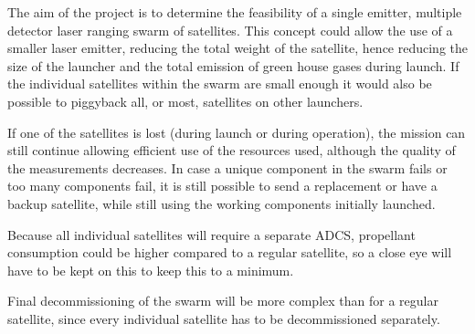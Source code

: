 The aim of the project is to determine the feasibility of a single emitter, multiple detector laser ranging swarm of satellites. This concept could allow the use of a smaller laser emitter, reducing the total weight of the satellite, hence reducing the size of the launcher and the total emission of green house gases during launch. If the individual satellites within the swarm are small enough it would also be possible to piggyback all, or most, satellites on other launchers. 

If one of the satellites is lost (during launch or during operation), the mission can still continue allowing efficient use of the resources used, although the quality of the measurements decreases. In case a unique component in the swarm fails or too many components fail, it is still possible to send a replacement or have a backup satellite, while still using the working components initially launched.

Because all individual satellites will require a separate ADCS, propellant consumption could be higher compared to a regular satellite, so a close eye will have to be kept on this to keep this to a minimum.

Final decommissioning of the swarm will be more complex than for a regular satellite, since every individual satellite has to be decommissioned separately.